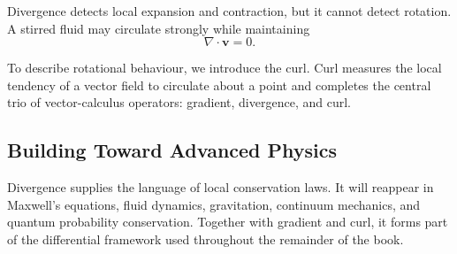 Divergence detects local expansion and contraction, but it cannot detect
rotation. A stirred fluid may circulate strongly while maintaining
\[
\nabla\cdot\mathbf v=0.
\]

To describe rotational behaviour, we introduce the curl. Curl measures the
local tendency of a vector field to circulate about a point and completes the
central trio of vector-calculus operators: gradient, divergence, and curl.

\subsection*{Building Toward Advanced Physics}

Divergence supplies the language of local conservation laws. It will reappear
in Maxwell's equations, fluid dynamics, gravitation, continuum mechanics, and
quantum probability conservation. Together with gradient and curl, it forms
part of the differential framework used throughout the remainder of the book.
